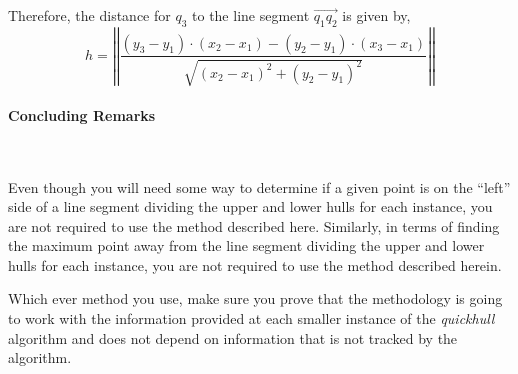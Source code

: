 \documentclass[letterpaper,10pt,english]{article}
\begin{document}
Therefore, the distance for $q_{3}$ to the line segment $\overrightarrow{q_{1}q_{2}}$ is given by, 
\[
  h = \left|\left| \frac{(y_{3} - y_{1}) \cdot (x_{2} - x_{1}) - (y_{2} - y_{1}) \cdot (x_{3} - x_{1})}
           {\sqrt{(x_{2} - x_{1})^{2} + (y_{2} - y_{1})^{2}}} \right|\right|
\]

\paragraph{Concluding Remarks} ~

Even though you will need some way to determine if a given point is on the ``left'' side of a line segment dividing the upper and lower hulls for each instance, you are not required to use the method described here. Similarly, in terms of finding the maximum point away from the line segment dividing the upper and lower hulls for each instance, you are not required to use the method described herein. 

Which ever method you use, make sure you prove that the methodology is going to work with the information provided at each smaller instance of the \emph{quickhull} algorithm and does not depend on information that is not tracked by the algorithm. 
\end{document}
